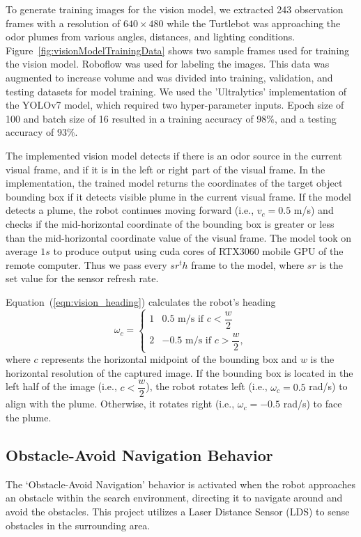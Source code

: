 To generate training images for the vision model, we extracted 243 observation frames with a resolution of $640 \times 480$ while the Turtlebot was approaching the odor plumes from various angles, distances, and lighting conditions. Figure~\ref{fig:visionModelTrainingData} shows two sample frames used for training the vision model. Roboflow \cite{ciaglia2022roboflow} was used for labeling the images. This data was augmented to increase volume and was divided into training, validation, and testing datasets for model training. We used the 'Ultralytics' implementation of the YOLOv7 model, which required two hyper-parameter inputs. Epoch size of 100 and batch size of 16 resulted in a training accuracy of 98\%, and a testing accuracy of 93\%.

The implemented vision model detects if there is an odor source in the current visual frame, and if it is in the left or right part of the visual frame. In the implementation, the trained model returns the coordinates of the target object bounding box if it detects visible plume in the current visual frame. If the model detects a plume, the robot continues moving forward (i.e., $v_c=0.5$ m/s) and checks if the mid-horizontal coordinate of the bounding box is greater or less than the mid-horizontal coordinate value of the visual frame. The model took on average $1 s$ to produce output using cuda cores of RTX3060 mobile GPU of the remote computer. Thus we pass every $sr^th$ frame to the model, where $sr$ is the set value for the sensor refresh rate.

Equation~(\ref{eqn:vision_heading}) calculates the robot's heading
\begin{equation}
  \omega_c =
    \begin{cases}
       1 & \text{$0.5$ m/s if $c<\dfrac{w}{2}$}\\
      2 & \text{$-0.5$ m/s if $c>\dfrac{w}{2}$},
    \end{cases}
\label{eqn:vision_heading}
\end{equation}
where $c$ represents the horizontal midpoint of the bounding box and $w$ is the horizontal resolution of the captured image. If the bounding box is located in the left half of the image (i.e., $c < \dfrac{w}{2}$), the robot rotates left (i.e., $\omega_c = 0.5$ rad/s) to align with the plume. Otherwise, it rotates right (i.e., $\omega_c = -0.5$ rad/s) to face the plume.

\subsection{Obstacle-Avoid Navigation Behavior}\label{Subsec:obstacle-avoid}
The `Obstacle-Avoid Navigation' behavior is activated when the robot approaches an obstacle within the search environment, directing it to navigate around and avoid the obstacles. This project utilizes a Laser Distance Sensor (LDS) to sense obstacles in the surrounding area.

